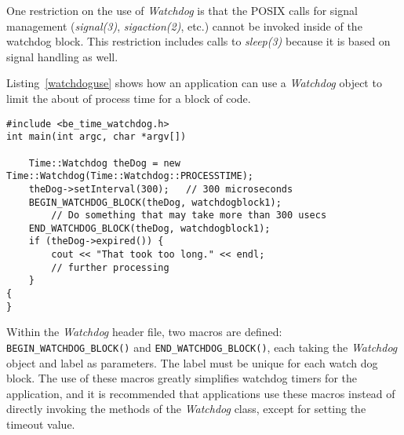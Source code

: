 One restriction on the use of {\em Watchdog} is that the POSIX calls for
signal management ({\em signal(3)}, {\em sigaction(2)}, etc.) cannot be
invoked inside of the watchdog block. This restriction includes calls to
{\em sleep(3)} because it is based on signal handling as well.

Listing~\ref{watchdoguse} shows how an application can use a {\em Watchdog}
object to limit the about of process time for a block of code.

\lstset{language=c++}
\begin{lstlisting}[caption={Using the Watchdog}, label=watchdoguse]
#include <be_time_watchdog.h>
int main(int argc, char *argv[])

	Time::Watchdog theDog = new Time::Watchdog(Time::Watchdog::PROCESSTIME);
	theDog->setInterval(300);	// 300 microseconds
	BEGIN_WATCHDOG_BLOCK(theDog, watchdogblock1);
		// Do something that may take more than 300 usecs
	END_WATCHDOG_BLOCK(theDog, watchdogblock1);
	if (theDog->expired()) {
		cout << "That took too long." << endl;
		// further processing
	}
{
}
\end{lstlisting}

Within the {\em Watchdog} header file, two macros are defined:
{\tt BEGIN\_WATCHDOG\_BLOCK()} and {\tt END\_WATCHDOG\_BLOCK()}, each taking
the {\em Watchdog} object and label as parameters. The label must be unique
for each watch dog block.  The use of these macros greatly simplifies
watchdog timers for the application, and it is recommended that applications
use these macros instead of directly invoking the methods of the
{\em Watchdog} class, except for setting the timeout value.
